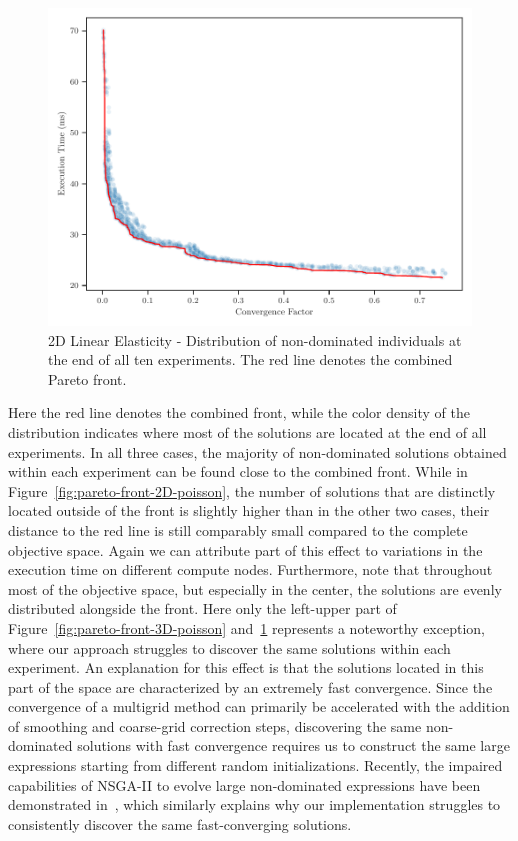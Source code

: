 \begin{figure}
	\includegraphics[width=\columnwidth]{figures/pareto_front_2D_FD_LinearElasticity_fromL2.pdf}
	\caption{2D Linear Elasticity - Distribution of non-dominated individuals at the end of all ten experiments. The red line denotes the combined Pareto front.}
	\label{fig:pareto-front-2D-linear-elasticity}
\end{figure}
Here the red line denotes the combined front, while the color density of the distribution indicates where most of the solutions are located at the end of all experiments. 
In all three cases, the majority of non-dominated solutions obtained within each experiment can be found close to the combined front.
While in Figure~\ref{fig:pareto-front-2D-poisson}, the number of solutions that are distinctly located outside of the front is slightly higher than in the other two cases, their distance to the red line is still comparably small compared to the complete objective space.
Again we can attribute part of this effect to variations in the execution time on different compute nodes.
Furthermore, note that throughout most of the objective space, but especially in the center, the solutions are evenly distributed alongside the front.
Here only the left-upper part of Figure~\ref{fig:pareto-front-3D-poisson} and~\ref{fig:pareto-front-2D-linear-elasticity} represents a noteworthy exception, where our approach struggles to discover the same solutions within each experiment.
An explanation for this effect is that the solutions located in this part of the space are characterized by an extremely fast convergence.
Since the convergence of a multigrid method can primarily be accelerated with the addition of smoothing and coarse-grid correction steps, discovering the same non-dominated solutions with fast convergence requires us to construct the same large expressions starting from different random initializations.
Recently, the impaired capabilities of NSGA-II to evolve large non-dominated expressions have been demonstrated in~\cite{liu2022evolvability}, which similarly explains why our implementation struggles to consistently discover the same fast-converging solutions.


